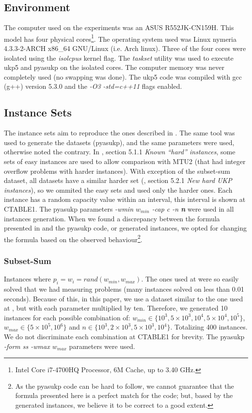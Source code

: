 \documentclass[runningheads,a4paper]{llncs}
\begin{document}
\subsection{Environment}

The computer used on the experiments was an ASUS R552JK-CN159H. This model has four physical cores\footnote{Intel Core i7-4700HQ Processor, 6M Cache, up to 3.40 GHz.}. The operating system used was Linux nymeria 4.3.3-2-ARCH x86\_64 GNU/Linux (i.e. Arch linux). Three of the four cores were isolated using the \emph{isolcpus} kernel flag. The \emph{taskset} utility was used to execute ukp5 and pyasukp on the isolated cores. The computer memory was never completely used (no swapping was done). The ukp5 code was compiled with gcc (g++) version 5.3.0 and the \emph{-O3 -std=c++11} flags enabled.

\subsection{Instance Sets}

The instance sets aim to reproduce the ones described in \cite{CPYA}. The same tool was used to generate the datasets (pyasukp), and the same parameters were used, otherwise noted the contrary. In \cite{CPYA}, section 5.1.1 \emph{Known ``hard'' instances}, some sets of easy instances are used to allow comparison with MTU2 (that had integer overflow problems with harder instances). With exception of the subset-sum dataset, all datasets have a similar harder set (\cite{CPYA}, section 5.2.1 \emph{New hard UKP instances}), so we ommited the easy sets and used only the harder ones. Each instance has a random capacity value within an interval, this interval is shown at CTABLE1. The pyasukp parameters \emph{-wmin \(w_{min}\) -cap c -n \textbf{n}} were used in all instances generation. When we found a discrepancy between the formula presented in \cite{CPYA} and the pyasukp code, or generated instances, we opted for changing the formula based on the observed behaviour\footnote{As the pyasukp code can be hard to follow, we cannot guarantee that the formula presented here is a perfect match for the code; but, based by the generated instances, we believe it to be correct to a good extent.}.

\subsubsection{Subset-Sum}\label{sec:subsetsum}
Instances where \(p_i = w_i = rand(w_{min}, w_{max})\). The ones used at \cite{CPYA} were so easily solved that we had measuring problems (many instances solved on less than 0.01 seconds). Because of this, in this paper, we use a dataset similar to the one used at \cite{CPYA}, but with each parameter multiplied by ten. Therefore, we generated 10 instances for each possible combination of: \(w_{min} \in \{10^3, 5\times10^3, 10^4, 5\times10^4, 10^5\}\), \(w_{max} \in \{5\times10^5, 10^6\}\) and \(n \in \{10^3, 2\times10^3, 5\times10^3, 10^4\}\). Totalizing 400 instances. We do not discriminate each combination at CTABLE1 for brevity. The pyasukp \emph{-form ss -wmax \(w_{max}\)} parameters were used.
\end{document}

